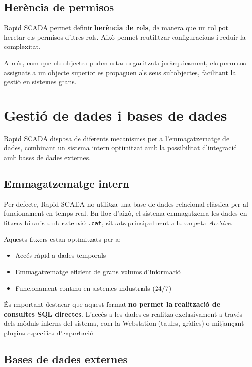 \documentclass[12pt,a4paper]{report}
\begin{document}
\subsection{Herència de permisos}

Rapid SCADA permet definir \textbf{herència de rols}, de manera que un rol pot heretar els permisos d'ltres rols. Això permet reutilitzar configuracions i reduir la complexitat.

A més, com que els objectes poden estar organitzats jeràrquicament, els permisos assignats a un objecte superior es propaguen als seus subobjectes, facilitant la gestió en sistemes grans.

\section{Gestió de dades i bases de dades}

Rapid SCADA disposa de diferents mecanismes per a l'emmagatzematge de dades, combinant un sistema intern optimitzat amb la possibilitat d'integració amb bases de dades externes.

\subsection{Emmagatzematge intern}

Per defecte, Rapid SCADA no utilitza una base de dades relacional clàssica per al funcionament en temps real. En lloc d'això, el sistema emmagatzema les dades en fitxers binaris amb extensió \texttt{.dat}, situats principalment a la carpeta \textit{Archive}.

Aquests fitxers estan optimitzats per a:
\begin{itemize}
    \item Accés ràpid a dades temporals
    \item Emmagatzematge eficient de grans volums d'informació
    \item Funcionament continu en sistemes industrials (24/7)
\end{itemize}

És important destacar que aquest format \textbf{no permet la realització de consultes SQL directes}. L'accés a les dades es realitza exclusivament a través dels mòduls interns del sistema, com la Webstation (taules, gràfics) o mitjançant plugins específics d'exportació.

\subsection{Bases de dades externes}
\end{document}
